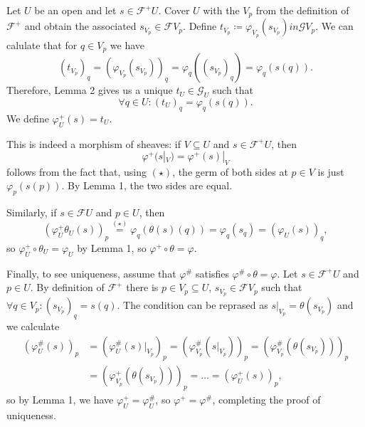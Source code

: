 Let $U$ be an open and let $s \in \mathcal{F}^+U$.
Cover $U$ with the $V_p$ from the definition of $\mathcal{F}^+$
and obtain the associated $s_{V_p} \in \mathcal{F}V_p$. Define
$t_{V_p} \coloneqq \varphi_{V_p}(s_{V_p}) in \mathcal{G}V_p$. We can calulate that
for $q \in V_p$ we have
\[ (t_{V_p})_q = (\varphi_{V_p}(s_{V_p}))_q = \varphi_q((s_{V_p})_q) = \varphi_q(s(q)). \]
Therefore, Lemma 2 gives us a unique $t_U \in \mathcal{G}_U$ such that
\begin{equation}\tag{$\star$}
	\forall q \in U\colon (t_U)_q = \varphi_q(s(q)).
\end{equation}
We define $\varphi^+_U(s) = t_U$.

This is indeed a morphism of sheaves: if $V \subseteq U$ and $s \in \mathcal{F}^+U$,
then
\[ \varphi^+(s|_V) = \varphi^+(s)|_V \]
follows from the fact that, using $(\star)$, the germ of both sides at $p \in V$
is just $\varphi_p(s(p))$. By Lemma 1, the two sides are equal.

Similarly, if $s \in \mathcal{F}U$ and $p \in U$, then
\[ (\varphi^+_U\theta_U(s))_p \stackrel{(\star)}{=} \varphi_q(\theta(s)(q)) = \varphi_q(s_q) = (\varphi_U(s))_q, \]
so $\varphi^+_U \circ \theta_U = \varphi_U$ by Lemma 1, so
$\varphi^+ \circ \theta = \varphi$.

Finally, to see uniqueness, assume that $\varphi^\#$ satisfies
 $\varphi^\# \circ \theta = \varphi$. Let $s \in \mathcal{F}^+U$ and $p \in U$.
By definition of $\mathcal{F}^+$ there is $p \in V_p \subseteq U$, $s_{V_p} \in \mathcal{F}V_p$
such that $\forall q \in V_p\colon (s_{V_p})_q = s(q)$. The condition can be
reprased as $s|_{V_p} = \theta(s_{V_p})$ and we calculate
\begin{align*}
	(\varphi^\#_U(s))_p &= (\varphi_U^\#(s)|_{V_p})_p
= (\varphi_{V_p}^\#(s|_{V_p}))_p
= (\varphi_{V_p}^\#(\theta(s_{V_p})))_p\\
	&= (\varphi_{V_p}^+(\theta(s_{V_p})))_p = \ldots = (\varphi^+_U(s))_p,
\end{align*}
so by Lemma 1, we have $\varphi^+_U = \varphi^\#_U$, so $\varphi^+ = \varphi^\#$,
completing the proof of uniqueness.
